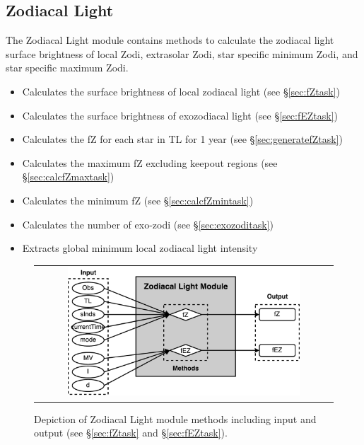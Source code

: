 \documentclass[cleanfoot]{asme2ej}
\newcommand{\reffig}[1]{Figure \ref{#1}}
\begin{document}
\subsection{Zodiacal Light}\label{sec:zodiacallight}
The Zodiacal Light module contains methods to calculate the zodiacal light surface brightness of local Zodi, extrasolar Zodi, star specific minimum Zodi, and star specific maximum Zodi.
\begin{itemize}[leftmargin=1in,font={\ttfamily}]
    \item[\texttt fZ] Calculates the surface brightness of local zodiacal light  (see \S\ref{sec:fZtask})
    \item[\texttt fEZ] Calculates the surface brightness of exozodiacal light (see \S\ref{sec:fEZtask})
    \item[\texttt generate\_fZ] Calculates the fZ for each star in TL for 1 year (see \S\ref{sec:generatefZtask})
    \item[\texttt calcfZmax] Calculates the maximum fZ excluding keepout regions (see \S\ref{sec:calcfZmaxtask})
    \item[\texttt calcfZmin] Calculates the minimum fZ (see \S\ref{sec:calcfZmintask})
    \item[\texttt gen\_systemnEZ] Calculates the number of exo-zodi (see \S\ref{sec:exozoditask})
    \item[\texttt extractfZmin\_fZQuads] Extracts global minimum local zodiacal light intensity
\end{itemize}

\begin{figure}[ht]
    \begin{center}
        \begin{tabular}{c}
             \includegraphics[width=0.8\textwidth]{ZodiTasks2}
        \end{tabular}
    \end{center}
    \caption{\label{fig:zodiacallightmodule} Depiction of Zodiacal Light module methods including input and output (see \S\ref{sec:fZtask} and \S\ref{sec:fEZtask}).}
\end{figure}
\end{document}
